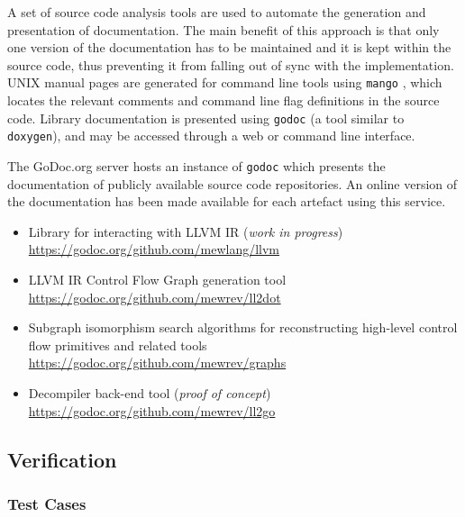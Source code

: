 \documentclass[12pt, a4paper]{article}
\begin{document}

A set of source code analysis tools are used to automate the generation and presentation of documentation. The main benefit of this approach is that only one version of the documentation has to be maintained and it is kept within the source code, thus preventing it from falling out of sync with the implementation. UNIX manual pages are generated for command line tools using \texttt{mango} \cite{mango}, which locates the relevant comments and command line flag definitions in the source code. Library documentation is presented using \texttt{godoc} \cite{godoc} (a tool similar to \texttt{doxygen}), and may be accessed through a web or command line interface.

The GoDoc.org server hosts an instance of \texttt{godoc} which presents the documentation of publicly available source code repositories. An online version of the documentation has been made available for each artefact using this service.

\begin{itemize}
	\item Library for interacting with LLVM IR (\textit{work in progress}) \\ \url{https://godoc.org/github.com/mewlang/llvm}
	\item LLVM IR Control Flow Graph generation tool \\ \url{https://godoc.org/github.com/mewrev/ll2dot}
	\item Subgraph isomorphism search algorithms for reconstructing high-level control flow primitives and related tools \\ \url{https://godoc.org/github.com/mewrev/graphs}
	\item Decompiler back-end tool (\textit{proof of concept}) \\ \url{https://godoc.org/github.com/mewrev/ll2go}
\end{itemize}


\subsection{Verification}

\subsubsection{Test Cases}
\end{document}
